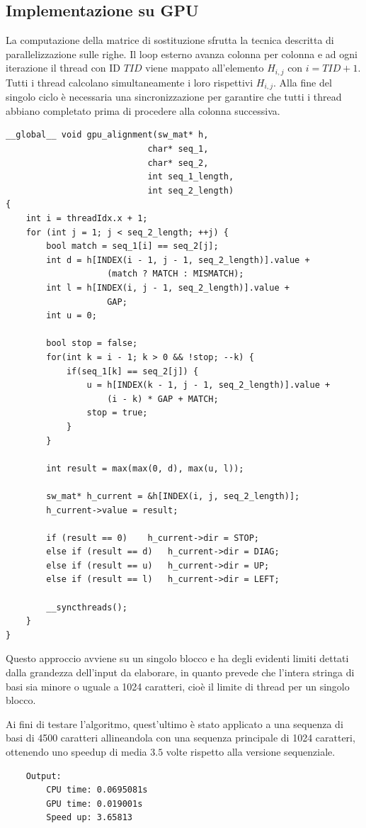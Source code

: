 \documentclass[a4paper,12pt]{article}
\begin{document}
\subsection{Implementazione su GPU}
La computazione della matrice di sostituzione sfrutta la tecnica descritta di parallelizzazione sulle righe. Il loop esterno avanza colonna per colonna e ad ogni iterazione il thread con ID $TID$ viene mappato all'elemento $H_{i,j}$ con $i = TID + 1$. Tutti i thread calcolano simultaneamente i loro rispettivi $H_{i,j}$. Alla fine del singolo ciclo è necessaria una sincronizzazione per garantire che tutti i thread abbiano completato prima di procedere alla colonna successiva.
\begin{lstlisting}
__global__ void gpu_alignment(sw_mat* h,
                            char* seq_1,
                            char* seq_2,
                            int seq_1_length,
                            int seq_2_length)
{
    int i = threadIdx.x + 1;
    for (int j = 1; j < seq_2_length; ++j) {
        bool match = seq_1[i] == seq_2[j];
        int d = h[INDEX(i - 1, j - 1, seq_2_length)].value +
                    (match ? MATCH : MISMATCH);
        int l = h[INDEX(i, j - 1, seq_2_length)].value +
                    GAP;
        int u = 0;

        bool stop = false;
        for(int k = i - 1; k > 0 && !stop; --k) {
            if(seq_1[k] == seq_2[j]) {
                u = h[INDEX(k - 1, j - 1, seq_2_length)].value +
                    (i - k) * GAP + MATCH;
                stop = true;
            }
        }
        
        int result = max(max(0, d), max(u, l));
        
        sw_mat* h_current = &h[INDEX(i, j, seq_2_length)];
        h_current->value = result;

        if (result == 0)    h_current->dir = STOP;
        else if (result == d)   h_current->dir = DIAG;
        else if (result == u)   h_current->dir = UP;
        else if (result == l)   h_current->dir = LEFT;

        __syncthreads();
    }
}
\end{lstlisting}

Questo approccio avviene su un singolo blocco e ha degli evidenti limiti dettati dalla grandezza dell'input da elaborare, in quanto prevede che l'intera stringa di basi sia minore o uguale a 1024 caratteri, cioè il limite di thread per un singolo blocco.

Ai fini di testare l'algoritmo, quest'ultimo è stato applicato a una sequenza di basi di 4500 caratteri allineandola con una sequenza principale di 1024 caratteri, ottenendo uno speedup di media $3.5$ volte rispetto alla versione sequenziale.
\begin{lstlisting}
    Output:
        CPU time: 0.0695081s
        GPU time: 0.019001s
        Speed up: 3.65813
\end{lstlisting}
    
\end{document}
